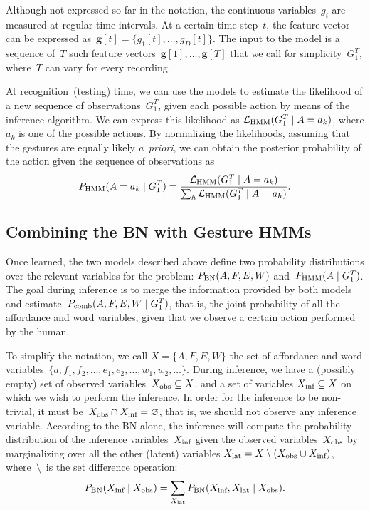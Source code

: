 Although not expressed so far in the notation, the continuous variables~$g_i$ are measured at regular time intervals.
At a certain time step~$t$, the feature vector can be expressed as~$\bm{g}[t] = \{g_1[t], \dots, g_D[t]\}$.
The input to the model is a sequence of~$T$ such feature vectors~$\bm{g}[1], \dots, \bm{g}[T]$ that we call for simplicity~$G_1^T$, where~$T$ can vary for every recording.

At recognition~(testing) time, we can use the models to estimate the likelihood of a new sequence of observations~$G_1^T$, given each possible action by means of the \FB{} inference algorithm.
We can express this likelihood as $\mathcal{L}_\text{HMM}(G_1^T \mid A=a_k)$, where $a_k$ is one of the possible actions.
By normalizing the likelihoods, assuming that the gestures are equally likely \emph{a~priori}, we can obtain the posterior probability of the action given the sequence of observations as
\begin{equation} \label{eq:phmm_action}
  \phmm(A=a_k \given G_1^T) = \frac{\mathcal{L}_\text{HMM}(G_1^T \given A=a_k)}{\sum_h \mathcal{L}_\text{HMM}(G_1^T \given A=a_h)}.
\end{equation}

\subsection{Combining the \acs{BN} with Gesture \acsp{HMM}}
\label{sec:combination}
Once learned, the two models described above define two probability distributions over the relevant variables for the problem:
$P_{\text{BN}}(A, F, E, W)$ and~$P_{\text{HMM}}(A \mid G_1^T)$.
The goal during inference is to merge the information provided by both models and estimate~$P_\text{comb}(A, F, E, W \mid G_1^T)$, that is, the joint probability of all the affordance and word variables, given that we observe a certain action performed by the human.

To simplify the notation, we call $X = \{A, F, E, W\}$ the set of affordance and word variables~$\{a, f_1, f_2, \dots, e_1, e_2, \dots, w_1, w_2, \dots\}$.
During inference, we have a (possibly empty) set of observed variables~$X_\text{obs} \subseteq X$, and a set of variables $X_\text{inf} \subseteq X$ on which we wish to perform the inference.
In order for the inference to be non-trivial, it must be~$X_\text{obs} \cap X_\text{inf} = \varnothing$, that is, we should not observe any inference variable.
According to the \ac{BN} alone, the inference will compute the probability distribution of the inference variables~$X_\text{inf}$ given the observed variables~$X_\text{obs}$ by marginalizing over all the other (latent) variables $X_\text{lat} = X \setminus (X_\text{obs} \cup X_\text{inf})$, where~$\setminus$~is the set difference operation:
\begin{equation*}
 P_{\text{BN}}(X_\text{inf} \mid X_\text{obs}) = \sum_{X_\text{lat}} P_{\text{BN}}(X_\text{inf}, X_\text{lat} \mid X_\text{obs}).
\end{equation*}

